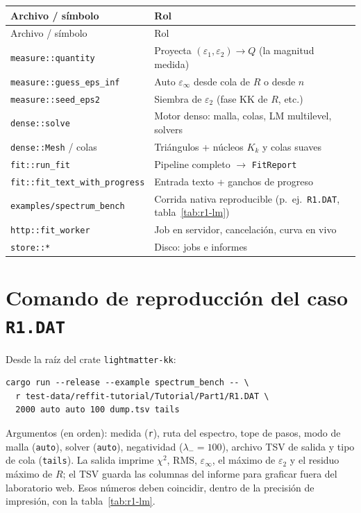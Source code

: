 \begin{longtable}{@{}lp{9.6cm}@{}}
\toprule
Archivo / s\'imbolo & Rol \\
\midrule
\endfirsthead
\toprule
Archivo / s\'imbolo & Rol \\
\midrule
\endhead
\texttt{measure::quantity} & Proyecta $(\varepsilon_1,\varepsilon_2)\to Q$ (la magnitud medida) \\
\texttt{measure::guess\_eps\_inf} & Auto $\varepsilon_\infty$ desde cola de $R$ o desde $n$ \\
\texttt{measure::seed\_eps2} & Siembra de $\varepsilon_2$ (fase KK de $R$, etc.) \\
\texttt{dense::solve} & Motor denso: malla, colas, LM multilevel, solvers \\
\texttt{dense::Mesh} / colas & Tri\'angulos + n\'ucleos $K_k$ y colas suaves \\
\texttt{fit::run\_fit} & Pipeline completo $\to$ \texttt{FitReport} \\
\texttt{fit::fit\_text\_with\_progress} & Entrada texto + ganchos de progreso \\
\texttt{examples/spectrum\_bench} & Corrida nativa reproducible (p.\ ej.\ \texttt{R1.DAT}, tabla~\ref{tab:r1-lm}) \\
\texttt{http::fit\_worker} & Job en servidor, cancelaci\'on, curva en vivo \\
\texttt{store::*} & Disco: jobs e informes \\
\bottomrule
\end{longtable}

\chapter{Comando de reproducci\'on del caso \texttt{R1.DAT}}
\label{ap:r1-cmd}

Desde la ra\'iz del crate \texttt{lightmatter-kk}:

\begin{verbatim}
cargo run --release --example spectrum_bench -- \
  r test-data/reffit-tutorial/Tutorial/Part1/R1.DAT \
  2000 auto auto 100 dump.tsv tails
\end{verbatim}

Argumentos (en orden): medida (\texttt{r}), ruta del espectro, tope de pasos, modo de malla (\texttt{auto}), solver (\texttt{auto}), negatividad ($\lambda_-=100$), archivo TSV de salida y tipo de cola (\texttt{tails}).
La salida imprime $\chi^{2}$, RMS, $\varepsilon_\infty$, el m\'aximo de $\varepsilon_2$ y el residuo m\'aximo de $R$; el TSV guarda las columnas del informe para graficar fuera del laboratorio web.
Esos n\'umeros deben coincidir, dentro de la precisi\'on de impresi\'on, con la tabla~\ref{tab:r1-lm}.

